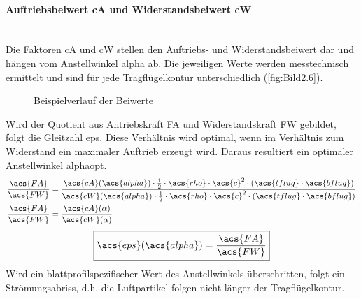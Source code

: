 \paragraph{Auftriebsbeiwert \acs{cA} und Widerstandsbeiwert \acs{cW}}\mbox{}\smallskip\\
Die Faktoren \acs{cA} und \acs{cW} stellen den Auftriebs- und Widerstandsbeiwert dar und hängen vom Anstellwinkel \acs{alpha} ab. Die jeweiligen Werte werden messtechnisch ermittelt und sind für jede Tragflügelkontur unterschiedlich (\autoref{fig:Bild2.6}).
\begin{figure}[H]
   \centering
   \caption[Beispielverlauf der Beiwerte]{Beispielverlauf der Beiwerte \cite{SkriptSchulte}}
   \label{fig:Bild2.6}
\end{figure}
\newpage
Wird der Quotient aus Antriebskraft \acs{FA} und Widerstandskraft \acs{FW} gebildet, folgt die Gleitzahl \acs{eps}. Diese Verhältnis wird optimal, wenn im Verhältnis zum Widerstand ein maximaler Auftrieb erzeugt wird. Daraus resultiert ein optimaler Anstellwinkel \acs{alphaopt}.
\begin{align}
    \frac{\acs{FA}}{\acs{FW}} &= \frac{\acs{cA}(\acs{alpha}) \cdot \frac{1}{2} \cdot \acs{rho} \cdot \acs{c}^2 \cdot (\acs{tflug} \cdot \acs{bflug})}{\acs{cW}(\acs{alpha}) \cdot \frac{1}{2} \cdot \acs{rho} \cdot \acs{c}^2 \cdot (\acs{tflug} \cdot \acs{bflug})} \nonumber \\
    \frac{\acs{FA}}{\acs{FW}} &= \frac{\acs{cA}(\alpha)}{\acs{cW}(\alpha)} \label{eq:Gleichung2.17}
\end{align}
\begin{equation} \label{eq:Gleichung2.18}
    \boxed{\acs{eps}(\acs{alpha}) = \frac{\acs{FA}}{\acs{FW}}}
\end{equation}
\newline
Wird ein blattprofilspezifischer Wert des Anstellwinkels überschritten, folgt ein Strömungsabriss, d.h. die Luftpartikel folgen nicht länger der Tragflügelkontur.

